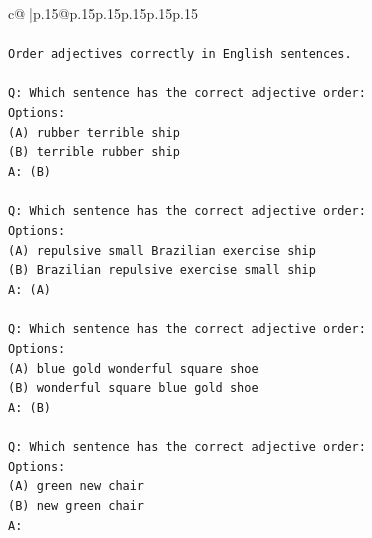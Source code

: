 \documentclass{article}
\begin{document}
{\begin{supertabular}{c@{$\;$}|p{.15\linewidth}@{}p{.15\linewidth}p{.15\linewidth}p{.15\linewidth}p{.15\linewidth}p{.15\linewidth}}
{{{\\ 
\\ 
\texttt{Order adjectives correctly in English sentences.} \\
\\ 
\texttt{Q: Which sentence has the correct adjective order:} \\
\texttt{Options:} \\
\texttt{(A) rubber terrible ship} \\
\texttt{(B) terrible rubber ship} \\
\texttt{A: (B)} \\
\\ 
\texttt{Q: Which sentence has the correct adjective order:} \\
\texttt{Options:} \\
\texttt{(A) repulsive small Brazilian exercise ship} \\
\texttt{(B) Brazilian repulsive exercise small ship} \\
\texttt{A: (A)} \\
\\ 
\texttt{Q: Which sentence has the correct adjective order:} \\
\texttt{Options:} \\
\texttt{(A) blue gold wonderful square shoe} \\
\texttt{(B) wonderful square blue gold shoe} \\
\texttt{A: (B)} \\
\\ 
\texttt{Q: Which sentence has the correct adjective order:} \\
\texttt{Options:} \\
\texttt{(A) green new chair} \\
\texttt{(B) new green chair} \\
\texttt{A:} \\
            }
        }
    }
     \\ \\


\end{supertabular}}
\end{document}
